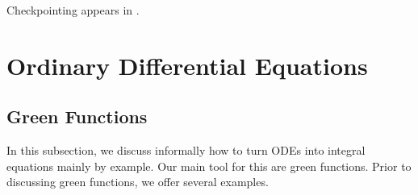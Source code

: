 \documentclass[a4paper,12pt]{article}
\begin{document}
\begin{related}
    Checkpointing appears in
    \cite{vicini_path_2021}.
\end{related}

\section{Ordinary Differential Equations}

%
%


\subsection{Green Functions}
In this subsection, we discuss informally how to turn ODEs into integral equations mainly
by example. Our main tool for this are green functions.
Prior to discussing green functions, we offer several
examples.
\end{document}
